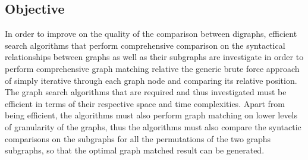 \subsection{Objective}
In order to improve on the quality of the comparison between digraphs, efficient search algorithms
that perform comprehensive comparison on the syntactical relationships between
graphs as well as their subgraphs are investigate in order to perform comprehensive graph matching
relative the generic brute force approach of simply iterative through each graph node and comparing its
relative position. The graph search algorithms that are required and thus investigated must be
efficient in terms of their respective space and time complexities.\newline\newline
Apart from being efficient, the algorithms must also perform graph matching on lower levels of
granularity of the graphs, thus the algorithms must also compare the syntactic comparisons on the subgraphs
for all the permutations of the two graphs subgraphs, so that the optimal graph matched result can be generated.
